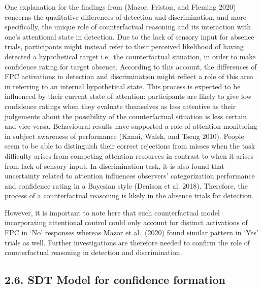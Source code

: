 \documentclass[
]{article}
\begin{document}
One explanation for the findings from (Mazor, Friston, and Fleming 2020)
concerns the qualitative differences of detection and discrimination,
and more specifically, the unique role of counterfactual reasoning and
its interaction with one's attentional state in detection. Due to the
lack of sensory input for absence trials, participants might instead
refer to their perceived likelihood of having detected a hypothetical
target i.e.~the counterfactual situation, in order to make confidence
rating for target absence. According to this account, the differences of
FPC activations in detection and discrimination might reflect a role of
this area in referring to an internal hypothetical state. This process
is expected to be influenced by their current state of attention:
participants are likely to give low confidence ratings when they
evaluate themselves as less attentive as their judgements about the
possibility of the counterfactual situation is less certain and vice
versa. Behavioural results have supported a role of attention monitoring
in subject awareness of performance (Kanai, Walsh, and Tseng 2010).
People seem to be able to distinguish their correct rejections from
misses when the task difficulty arises from competing attention
resources in contrast to when it arises from lack of sensory input. In
discrimination task, it is also found that uncertainty related to
attention influences observers' categorization performance and
confidence rating in a Bayesian style (Denison et al. 2018). Therefore,
the process of a counterfactual reasoning is likely in the absence
trials for detection.

However, it is important to note here that such counterfactual model
incorporating attentional control could only account for distinct
activations of FPC in `No' responses whereas Mazor et al.~(2020) found
similar pattern in `Yes' trials as well. Further investigations are
therefore needed to confirm the role of counterfactual reasoning in
detection and discrimination.

\hypertarget{sdt-model-for-confidence-formation}{%
\subsection{2.6. SDT Model for confidence
formation}\label{sdt-model-for-confidence-formation}}
\end{document}
